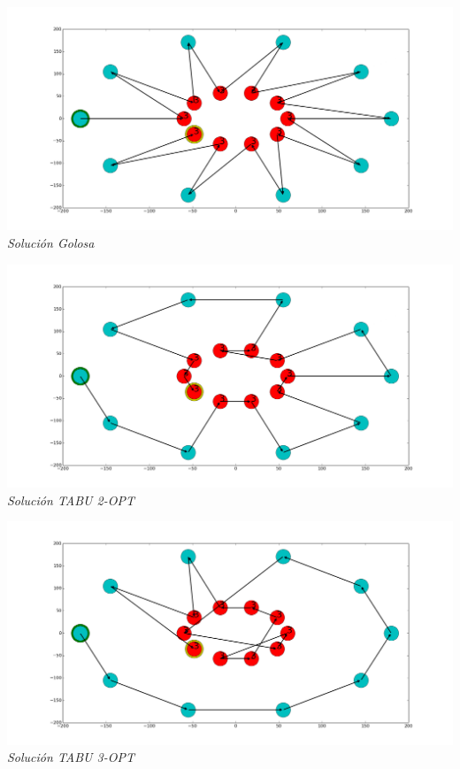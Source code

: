 \vspace*{0.3cm} \vspace*{0.3cm}
  \begin{center}
 \includegraphics[scale=0.3]{./EJ4/fam7goloso.png}\\
 {            \textit{Soluci\'on Golosa}}
  \end{center}
  \vspace*{0.3cm}

\vspace*{0.3cm} \vspace*{0.3cm}
  \begin{center}
 \includegraphics[scale=0.3]{./EJ4/fam72opt.png}\\
 {            \textit{Soluci\'on TABU 2-OPT}}
  \end{center}
  \vspace*{0.3cm}

\vspace*{0.3cm} \vspace*{0.3cm}
  \begin{center}
 \includegraphics[scale=0.3]{./EJ4/fam73opt.png}\\
 {            \textit{Soluci\'on TABU 3-OPT}}
  \end{center}
  \vspace*{0.3cm}

